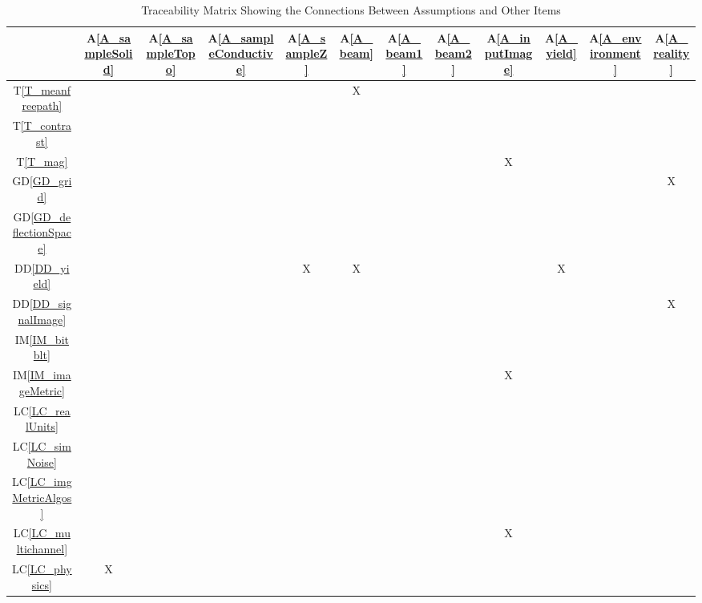 \documentclass[12pt]{article}
\newcommand{\dref}[1]{GD\ref{#1}}
\newcommand{\ddref}[1]{DD\ref{#1}}
\newcommand{\tref}[1]{T\ref{#1}}
\newcommand{\aref}[1]{A\ref{#1}}
\newcommand{\iref}[1]{IM\ref{#1}}
\newcommand{\lcref}[1]{LC\ref{#1}}
\begin{document}
\begin{table}[h!]
\centering
\begin{tabular}{|c|c|c|c|c|c|c|c|c|c|c|c|}
\hline
	& \aref{A_sampleSolid}
	& \aref{A_sampleTopo}
	& \aref{A_sampleConductive}
	& \aref{A_sampleZ}
	& \aref{A_beam}
	& \aref{A_beam1}
	& \aref{A_beam2}
	& \aref{A_inputImage}
	& \aref{A_yield}
	& \aref{A_environment}
	& \aref{A_reality}
\\ \hline
\tref{T_meanfreepath}      & & & & &X& & & & & &  \\ \hline
\tref{T_contrast}          & & & & & & & & & & &  \\ \hline
\tref{T_mag}               & & & & & & & &X& & &  \\ \hline
\dref{GD_grid}             & & & & & & & & & & &X \\ \hline
\dref{GD_deflectionSpace}  & & & & & & & & & & &  \\ \hline
\ddref{DD_yield}           & & & &X&X& & & &X& &  \\ \hline
\ddref{DD_signalImage}     & & & & & & & & & & &X \\ \hline
\iref{IM_bitblt}           & & & & & & & & & & &  \\ \hline
\iref{IM_imageMetric}      & & & & & & & &X& & &  \\ \hline
\lcref{LC_realUnits}       & & & & & & & & & & &  \\ \hline
\lcref{LC_simNoise}        & & & & & & & & & & &  \\ \hline
\lcref{LC_imgMetricAlgos}  & & & & & & & & & & &  \\ \hline
\lcref{LC_multichannel}    & & & & & & & &X& & &  \\ \hline
\lcref{LC_physics}         &X& & & & & & & & & &  \\ \hline
\end{tabular}
\caption{Traceability Matrix Showing the Connections Between Assumptions and Other Items}
\label{Table:A_trace}
\end{table}
\end{document}
